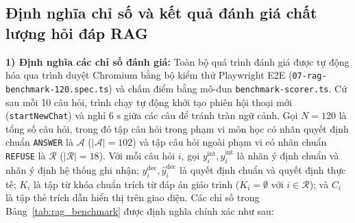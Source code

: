 \documentclass{IEEEtran}
\begin{document}
\subsection{Định nghĩa chỉ số và kết quả đánh giá chất lượng hỏi đáp RAG}
\label{subsec:rag_eval}
\textbf{1) Định nghĩa các chỉ số đánh giá:}
Toàn bộ quá trình đánh giá được tự động hóa qua trình duyệt Chromium bằng bộ kiểm thử Playwright E2E (\texttt{07-rag-benchmark-120.spec.ts}) và chấm điểm bằng mô-đun \texttt{benchmark-scorer.ts}. Cứ sau mỗi 10 câu hỏi, trình chạy tự động khởi tạo phiên hội thoại mới (\texttt{startNewChat}) và nghỉ $6\text{~s}$ giữa các câu để tránh tràn ngữ cảnh. Gọi $N = 120$ là tổng số câu hỏi, trong đó tập câu hỏi trong phạm vi môn học có nhãn quyết định chuẩn \texttt{ANSWER} là $\mathcal{A}$ ($|\mathcal{A}| = 102$) và tập câu hỏi ngoài phạm vi có nhãn chuẩn \texttt{REFUSE} là $\mathcal{R}$ ($|\mathcal{R}| = 18$). Với mỗi câu hỏi $i$, gọi $y_i^{\text{int}}, \hat{y}_i^{\text{int}}$ là nhãn ý định chuẩn và nhãn ý định hệ thống ghi nhận; $y_i^{\text{dec}}, \hat{y}_i^{\text{dec}}$ là quyết định chuẩn và quyết định thực tế; $K_i$ là tập từ khóa chuẩn trích từ đáp án giáo trình ($K_i = \emptyset$ với $i \in \mathcal{R}$); và $C_i$ là tập thẻ trích dẫn hiển thị trên giao diện. Các chỉ số trong Bảng~\ref{tab:rag_benchmark} được định nghĩa chính xác như sau:
\end{document}
